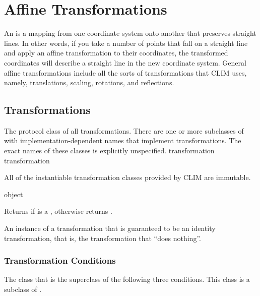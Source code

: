 
\chapter {Affine Transformations}
\label {transforms}

An  is a mapping from one coordinate system onto
another that preserves straight lines.  In other words, if you take a number of
points that fall on a straight line and apply an affine transformation to their
coordinates, the transformed coordinates will describe a straight line in the
new coordinate system.  General affine transformations include all the sorts of
transformations that CLIM uses, namely, translations, scaling, rotations, and
reflections.


\section {Transformations}


The protocol class of all transformations.  There are one or more subclasses of
 with implementation-dependent names that implement
transformations.  The exact names of these classes is explicitly unspecified.
 {transformation} {transformation}

All of the instantiable transformation classes provided by CLIM are immutable.

 {object}

Returns  if  is a , otherwise
returns .


An instance of a transformation that is guaranteed to be an identity
transformation, that is, the transformation that ``does nothing''.


\subsection {Transformation Conditions}


The class that is the superclass of the following three conditions.  This class
is a subclass of .


